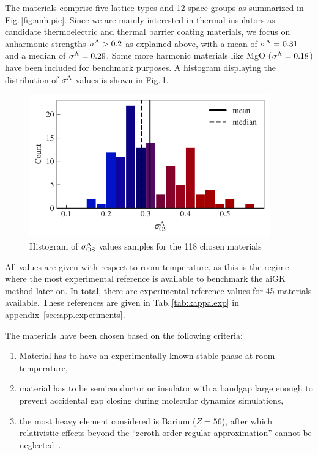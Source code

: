 The materials comprise five lattice types and 12 space groups as summarized in Fig.\,\ref{fig:anh.pie}.
Since we are mainly interested in thermal insulators as candidate thermoelectric and thermal barrier coating materials, we focus on anharmonic strengths $\sigma^\mathrm{A} > 0.2$ as explained above, with a mean of $\sigma^\mathrm{A}=0.31$ and a median of $\sigma^\mathrm{A} = 0.29$. Some more harmonic materials like MgO ($\sigma^\mathrm{A} = 0.18$) have been included for benchmark purposes. A histogram displaying the distribution of $\sigma^\mathrm{A}$ values is shown in Fig.\,\ref{fig:anh.histogram}.
\begin{figure}
	\includegraphics[width=4.1in]{./data/plots/dataset/histogram.pdf}
	\caption{
		Histogram of $\sigma^\mathrm{A}_\mathrm{OS}$ values samples for the 118 chosen materials
	}
	\label{fig:anh.histogram}
\end{figure}
All values are given with respect to room temperature, as this is the regime where the most experimental reference is available to benchmark the aiGK method later on. In total, there are experimental reference values for 45 materials available. These references are given in Tab.\,\ref{tab:kappa.exp} in appendix~\ref{sec:app.experiments}.


The materials have been chosen based on the following criteria:
\begin{enumerate}
	\item Material has to have an experimentally known stable phase at room temperature,
	\item material has to be semiconductor or insulator with a bandgap large enough to prevent accidental gap closing during molecular dynamics simulations,
	\item the most heavy element considered is Barium ($Z=56$), after which relativistic effects beyond the ``zeroth order regular approximation'' cannot be neglected~\cite{Vanlenthe.1994,Huhn.2017,Zhao.2021}.
\end{enumerate}

